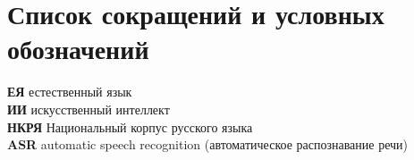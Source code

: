 \chapter*{Список сокращений и условных обозначений} %
\noindent
\textbf{ЕЯ} естественный язык \\
\textbf{ИИ} искусственный интеллект \\
\textbf{НКРЯ} Национальный корпус русского языка \\
\textbf{ASR} automatic speech recognition (автоматическое распознавание речи)
